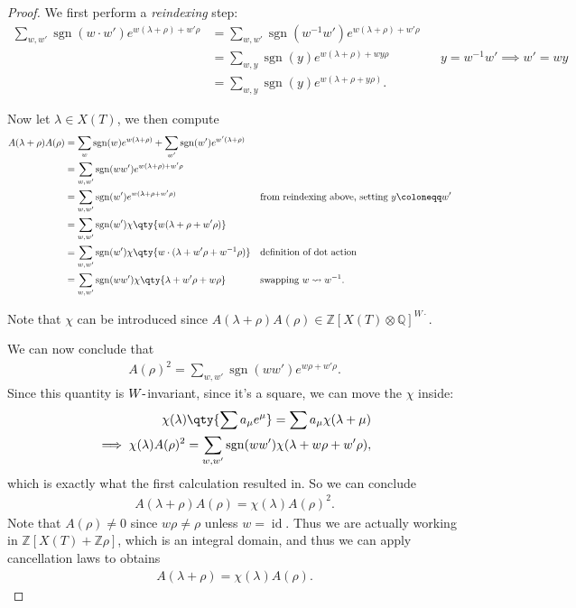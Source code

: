 \begin{proof}

We first perform a \emph{reindexing} step:
\begin{align*}  
\sum_{w, w'} \operatorname{sgn}(w\cdot w') e^{w(\lambda+\rho) + w'\rho}
&= \sum_{w, w'} \operatorname{sgn}(w^{-1} w') e^{w(\lambda+\rho) + w'\rho} \\
&= \sum_{w, y} \operatorname{sgn}(y) e^{w(\lambda+\rho) + wy\rho} && y = w^{-1}w' \implies w' = wy \\
&= \sum_{w, y} \operatorname{sgn}(y) e^{w(\lambda + \rho + y\rho)}
.\end{align*}

Now let \(\lambda\in X(T)\), we then compute
\begin{align*}  
A(\lambda + \rho) A(\rho)
&=
\sum_{w} \operatorname{sgn}(w) e^{w(\lambda + \rho)}
+ \sum_{w'} \operatorname{sgn}(w') e^{w'(\lambda + \rho)}  \\
&=
\sum_{w, w'} \operatorname{sgn}(ww') e^{w(\lambda + \rho) + w'\rho} \\
&= 
\sum_{w, w'} \operatorname{sgn}(w') e^{w(\lambda + \rho + w'\rho)} && \text{from reindexing above, setting } y\coloneqq w' \\
&= \sum_{w, w'} \operatorname{sgn}(w') \chi\qty{w(\lambda + \rho + w'\rho)} \\
&= \sum_{w, w'} \operatorname{sgn}(w') \chi\qty{w\cdot (\lambda + w'\rho + w^{-1} \rho)} && \text{definition of dot action}\\
&= \sum_{w, w'} \operatorname{sgn}(ww') \chi\qty{\lambda + w'\rho + w\rho }  && \text{swapping } w\leadsto w^{-1}  
.\end{align*}

Note that \(\chi\) can be introduced since
\(A(\lambda + \rho)A(\rho) \in {\mathbb{Z}}[X(T) \otimes{\mathbb{Q}}]^{W\cdot}\).


We can now conclude that
\begin{align*}  
A(\rho)^2 = \sum_{w, w'} \operatorname{sgn}(ww') e^{w\rho + w' \rho}
.\end{align*}
Since this quantity is \(W{\hbox{-}}\)invariant, since it's a square, we
can move the \(\chi\) inside:
\begin{align*}  
\chi(\lambda) \qty{ \sum a_\mu e^\mu } = \sum a_\mu \chi(\lambda + \mu) \\
\implies \chi(\lambda) A(\rho)^2 = \sum_{w, w'} \operatorname{sgn}(ww') \chi(\lambda + w\rho + w'\rho)
,\end{align*}
which is exactly what the first calculation resulted in. So we can
conclude
\begin{align*}  
A(\lambda + \rho) A(\rho) = \chi(\lambda) A(\rho)^2
.\end{align*}
Note that \(A(\rho) \neq 0\) since \(w\rho \neq \rho\) unless
\(w=\operatorname{id}\). Thus we are actually working in
\({\mathbb{Z}}[X(T) + {\mathbb{Z}}\rho]\), which is an integral domain,
and thus we can apply cancellation laws to obtains
\begin{align*}  
A(\lambda + \rho) = \chi(\lambda) A(\rho)
.\end{align*}


\end{proof}
